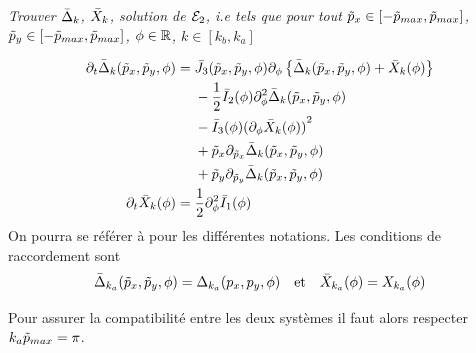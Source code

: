 \documentclass[10pt]{article}
\begin{document}
\begin{multicols}{2}
\noindent
{\itshape Trouver $\bar{\Delta}_k$, $\bar{X}_k$, solution de $\mathcal{E}_2$, i.e tels que pour tout $\tilde{p}_x \in [-\tilde{p}_{max}, \tilde{p}_{max}]$, $\tilde{p}_y \in [-\tilde{p}_{max}, \tilde{p}_{max}]$, $\phi \in \mathbb{R}$, $k\in [k_b, k_a]$}

\begin{align}
	\partial_t  \bar{\Delta}_k (\tilde{p}_x, \tilde{p}_y, \phi) & = 
	\begin{aligned}[t]
	&  \bar{J}_3(\tilde{p}_x, \tilde{p}_y, \phi) \partial_{\phi} \left\{ \bar{\Delta}_k (\tilde{p}_x, \tilde{p}_y, \phi) + \bar{X}_k(\phi) \right\} \\
	&  - \frac{1}{2} \bar{I}_2(\phi) \partial_{\phi}^2 \bar{\Delta}_k(\tilde{p}_x, \tilde{p}_y, \phi) \\
	& - \bar{I}_3(\phi){(\partial_{\phi} \bar{X}_k(\phi))}^2 \\
	& + \tilde{p}_x \partial_{\tilde{p}_x} \bar{\Delta}_k (\tilde{p}_x, \tilde{p}_y, \phi)  \\
	& + \tilde{p}_y \partial_{\tilde{p}_y}  \bar{\Delta}_k (\tilde{p}_x, \tilde{p}_y, \phi) 
	\end{aligned}
	\label{eqn} \\
	\partial_t \bar{X}_k(\phi) & = 
	\begin{aligned}[t]
		& \frac{1}{2} \partial_{\phi}^2 \bar{I}_1(\phi)
	\end{aligned}
\end{align}
On pourra se référer à  pour les différentes notations. Les conditions de raccordement sont
\begin{equation*}
\bar{\Delta}_{k_a}(\tilde{p}_x, \tilde{p}_y, \phi) = \Delta_{k_a}(p_x, p_y, \phi) \quad \text{et} \quad \bar{X}_{k_a}(\phi) = X_{k_a}(\phi)
\end{equation*}

Pour assurer la compatibilité entre les deux systèmes il faut alors respecter $k_a\tilde{p}_{max} = \pi$. \\


\end{multicols}
\end{document}
